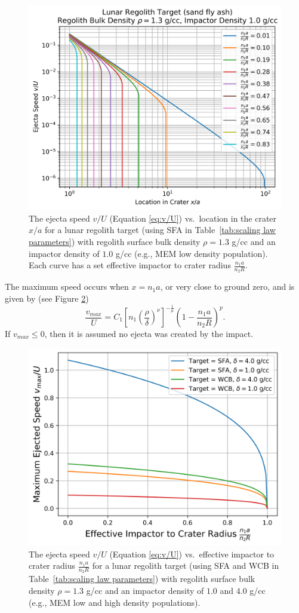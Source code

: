 \documentclass{article}
\begin{document}
\begin{figure}[!htb]
	\centering
	\includegraphics[width=0.65\linewidth]{v_vs_x_lodens.png}
	\caption{The ejecta speed $v/U$ (Equation \eqref{eq:v/U}) vs.\ location in the crater $x/a$ for a lunar regolith target (using SFA in Table~\ref{tab:scaling law parameters}) with regolith surface bulk density $\rho = 1.3$ g/cc and an impactor density of $1.0$ g/cc (e.g., MEM low density population). Each curve has a set effective impactor to crater radius $\frac{n_1 a}{n_2 R}$.}\label{fig:v_vs_x_lodens}
\end{figure}


The maximum speed occurs when $x = n_1 a$, or very close to ground zero, and is given by (see Figure \ref{fig:vmax_vs_x})
\begin{equation}\label{eq:vmax}
\frac{v_{max}}{U} = C_1\left[n_1\left(\frac{\rho}{\delta}\right)^\nu\right]^{-\frac{1}{\mu}}\left(1 - \frac{n_1 a}{n_2 R}\right)^p.
\end{equation}
If $v_{max} \le 0$, then it is assumed no ejecta was created by the impact.

\begin{figure}[!htb]
	\centering
	\includegraphics[width=0.65\linewidth]{vmax_vs_x.png}
	\caption{The ejecta speed $v/U$ (Equation \eqref{eq:v/U}) vs.\ effective impactor to crater radius $\frac{n_1 a}{n_2 R}$ for a lunar regolith target (using SFA and WCB in Table~\ref{tab:scaling law parameters}) with regolith surface bulk density $\rho = 1.3$ g/cc and an impactor density of $1.0$ and $4.0$ g/cc (e.g., MEM low and high density populations).}\label{fig:vmax_vs_x}
\end{figure}
\end{document}
